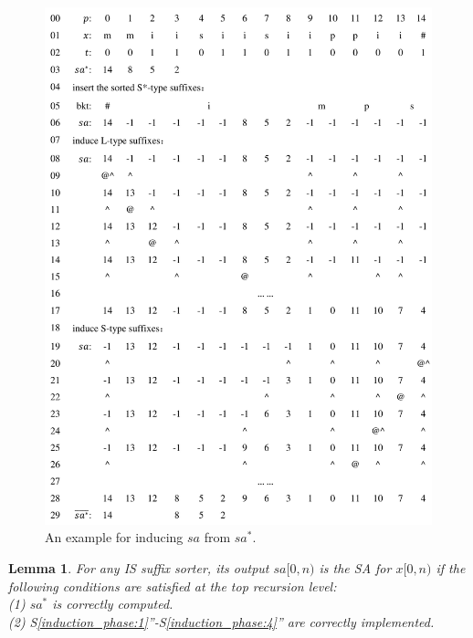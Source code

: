 \documentclass[10pt,journal,compsoc]{IEEEtran}
\newtheorem{lemma}[theorem]{Lemma}
\begin{document}
\begin{figure}[t]
	\centering
	
	\includegraphics[width = 1\columnwidth]{example.pdf}
	
	\caption{An example for inducing $sa$ from $sa^*$.}
	
	\label{fig:example1}
	
\end{figure}


\begin{lemma} \label{lemma:2}
    For any IS suffix sorter, its output $sa[0, n)$ is the SA for $x[0, n)$ if the following conditions are satisfied at the top recursion level: \\
    (1) $sa^*$ is correctly computed. \\
    (2) S\ref{induction_phase:1}''-S\ref{induction_phase:4}'' are correctly implemented. \\
\end{lemma}
\end{document}
